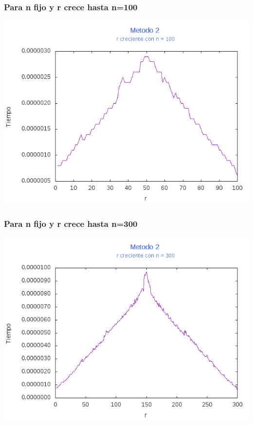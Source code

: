 \documentclass[12pt,letterpaper]{scrartcl}
\begin{document}
\subsubsection{Para n fijo y r crece hasta n=100}
\includegraphics[scale=1]{Metodo2/plot100m2}

\subsubsection{Para n fijo y r crece hasta n=300}
\includegraphics[scale=1]{Metodo2/plot300m2}
\end{document}
